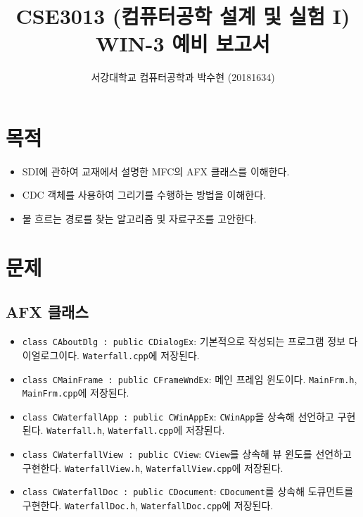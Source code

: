 
	


\title{CSE3013 (컴퓨터공학 설계 및 실험 I) \space \newline WIN-3 예비 보고서}
\author{서강대학교 컴퓨터공학과 박수현 (20181634)}
\maketitle

\section{목적}
\begin{itemize}
	\item SDI에 관하여 교재에서 설명한 MFC의 AFX 클래스를 이해한다.
	\item CDC 객체를 사용하여 그리기를 수행하는 방법을 이해한다.
	\item 물 흐르는 경로를 찾는 알고리즘 및 자료구조를 고안한다.
\end{itemize}

\section{문제}

\subsection{AFX 클래스}
\begin{itemize}
	\item \texttt{class CAboutDlg : public CDialogEx}: 기본적으로 작성되는 프로그램 정보 다이얼로그이다. \texttt{Waterfall.cpp}에 저장된다.
	\item \texttt{class CMainFrame : public CFrameWndEx}: 메인 프레임 윈도이다. \texttt{MainFrm.h}, \texttt{MainFrm.cpp}에 저장된다.
	\item \texttt{class CWaterfallApp : public CWinAppEx}: \texttt{CWinApp}을 상속해 선언하고 구현된다. \texttt{Waterfall.h}, \texttt{Waterfall.cpp}에 저장된다.
	\item \texttt{class CWaterfallView : public CView}: \texttt{CView}를 상속해 뷰 윈도를 선언하고 구현한다. \texttt{WaterfallView.h}, \texttt{WaterfallView.cpp}에 저장된다.
	\item \texttt{class CWaterfallDoc : public CDocument}: \texttt{CDocument}를 상속해 도큐먼트를 구현한다. \texttt{WaterfallDoc.h}, \texttt{WaterfallDoc.cpp}에 저장된다.
\end{itemize}

